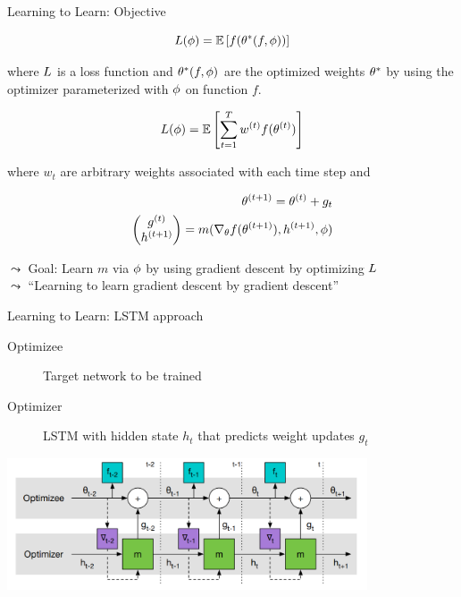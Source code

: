 \begin{frame}[c]{Learning to Learn: Objective }

\vspace{-0.5cm}
\begin{equation}
L(\phi) = \mathbb{E}\left[ f(\theta^*(f,\phi)) \right]\nonumber
\end{equation}

where $L$ is a loss function and $\theta^*(f,\phi)$ are the optimized weights $\theta^*$ by using the optimizer parameterized with $\phi$ on function $f$.

\pause

\begin{equation}
L(\phi) = \mathbb{E}\left[\sum_{t=1}^T w^{(t)} f(\theta^{(t)})\right]\nonumber
\end{equation}

\pause
where $w_t$ are arbitrary weights associated with each time step
and 

\pause
\vspace{-0.5cm}
\begin{eqnarray}
\theta^{(t+1)} = \theta^{(t)} + g_t\nonumber\\
\begin{pmatrix}g^{(t)}\\h^{(t+1)}\end{pmatrix} = m(\nabla_\theta f(\theta^{(t+1)}), h^{(t+1)}, \phi)\nonumber
\end{eqnarray}

\pause
$\leadsto$ Goal: Learn $m$ via $\phi$ by using gradient descent by optimizing $L$ \\
\pause
$\leadsto$ ``Learning to learn gradient descent by gradient descent''
\end{frame}
\begin{frame}[c]{Learning to Learn: LSTM approach }

\begin{description}
\item[Optimizee] Target network to be trained
\item[Optimizer] LSTM with hidden state $h_t$ that predicts weight updates $g_t$
\end{description}

\medskip

\centering
\includegraphics[width=0.8\textwidth]{images/learning_to_learn_lstm}

\end{frame}
